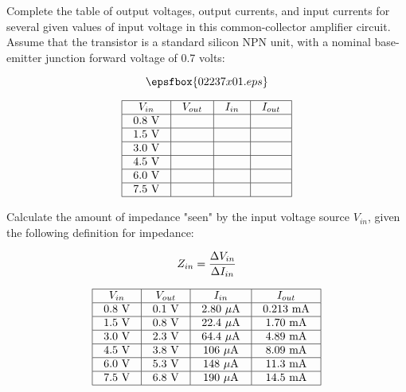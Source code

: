 

Complete the table of output voltages, output currents, and input currents for several given values of input voltage in this common-collector amplifier circuit.  Assume that the transistor is a standard silicon NPN unit, with a nominal base-emitter junction forward voltage of 0.7 volts:

$$\epsfbox{02237x01.eps}$$


$$\vbox{\offinterlineskip
\halign{\strut
\vrule \quad\hfil # \ \hfil & 
\vrule \quad\hfil # \ \hfil & 
\vrule \quad\hfil # \ \hfil & 
\vrule \quad\hfil # \ \hfil \vrule \cr
\noalign{\hrule}
%
$V_{in}$ & $V_{out}$ & $I_{in}$ & $I_{out}$ \cr
%
\noalign{\hrule}
%
0.8 V &  &  & \cr
%
\noalign{\hrule}
%
1.5 V &  &  & \cr
%
\noalign{\hrule}
%
3.0 V &  &  & \cr
%
\noalign{\hrule}
%
4.5 V &  &  & \cr
%
\noalign{\hrule}
%
6.0 V &  &  & \cr
%
\noalign{\hrule}
%
7.5 V &  &  & \cr
%
\noalign{\hrule}
} %
}$$ %

Calculate the amount of impedance "seen" by the input voltage source $V_{in}$, given the following definition for impedance:

$$Z_{in} = {\Delta V_{in} \over \Delta I_{in}}$$








$$\vbox{\offinterlineskip
\halign{\strut
\vrule \quad\hfil # \ \hfil & 
\vrule \quad\hfil # \ \hfil & 
\vrule \quad\hfil # \ \hfil & 
\vrule \quad\hfil # \ \hfil \vrule \cr
\noalign{\hrule}
%
$V_{in}$ & $V_{out}$ & $I_{in}$ & $I_{out}$ \cr
%
\noalign{\hrule}
%
0.8 V & 0.1 V & 2.80 $\mu$A & 0.213 mA \cr
%
\noalign{\hrule}
%
1.5 V & 0.8 V & 22.4 $\mu$A & 1.70 mA \cr
%
\noalign{\hrule}
%
3.0 V & 2.3 V & 64.4 $\mu$A & 4.89 mA \cr
%
\noalign{\hrule}
%
4.5 V & 3.8 V & 106 $\mu$A & 8.09 mA \cr
%
\noalign{\hrule}
%
6.0 V & 5.3 V & 148 $\mu$A & 11.3 mA \cr
%
\noalign{\hrule}
%
7.5 V & 6.8 V & 190 $\mu$A & 14.5 mA \cr
%
\noalign{\hrule}
} %
}$$ %


